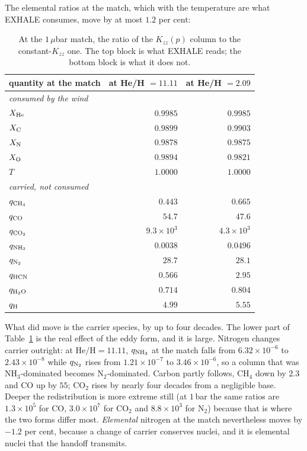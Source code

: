 \documentclass[english,a4paper]{my_memo}
\begin{document}
The elemental ratios at the match, which with the temperature are what EXHALE
consumes, move by at most $1.2$ per cent:

\begin{table}[htbp]\centering\small
\caption{At the $1\,\mu$bar match, the ratio of the $K_{zz}(p)$ column to the
constant-$K_{zz}$ one. The top block is what EXHALE reads; the bottom block
is what it does not.}
\label{tab:kzzformmatch}
\begin{tabular}{lrr}
\toprule
quantity at the match & at He/H $=11.11$ & at He/H $=2.09$ \\
\midrule
\multicolumn{3}{l}{\emph{consumed by the wind}} \\
$X_{\rm He}$ & $0.9985$ & $0.9985$ \\
$X_{\rm C}$  & $0.9899$ & $0.9903$ \\
$X_{\rm N}$  & $0.9878$ & $0.9875$ \\
$X_{\rm O}$  & $0.9894$ & $0.9821$ \\
$T$          & $1.0000$ & $1.0000$ \\
\midrule
\multicolumn{3}{l}{\emph{carried, not consumed}} \\
$q_{\rm CH_4}$ & $0.443$ & $0.665$ \\
$q_{\rm CO}$   & $54.7$  & $47.6$ \\
$q_{\rm CO_2}$ & $9.3\times10^{3}$ & $4.3\times10^{3}$ \\
$q_{\rm NH_3}$ & $0.0038$ & $0.0496$ \\
$q_{\rm N_2}$  & $28.7$  & $28.1$ \\
$q_{\rm HCN}$  & $0.566$ & $2.95$ \\
$q_{\rm H_2O}$ & $0.714$ & $0.804$ \\
$q_{\rm H}$    & $4.99$  & $5.55$ \\
\bottomrule
\end{tabular}
\end{table}

\medskip
\noindent What did move is the carrier species, by up to four decades. The
lower part of Table~\ref{tab:kzzformmatch} is the real effect of the eddy
form, and it is large. Nitrogen changes carrier outright: at
$\mathrm{He/H} = 11.11$, $q_{\rm NH_3}$ at the match falls from
$6.32\times10^{-6}$ to $2.43\times10^{-8}$ while $q_{\rm N_2}$ rises from
$1.21\times10^{-7}$ to $3.46\times10^{-6}$, so a column that was
NH$_3$-dominated becomes N$_2$-dominated. Carbon partly follows, CH$_4$ down
by $2.3$ and CO up by $55$; CO$_2$ rises by nearly four decades from a
negligible base. Deeper the redistribution is more extreme still (at $1$\,bar
the same ratios are $1.3\times10^{5}$ for CO, $3.0\times10^{7}$ for CO$_2$
and $8.8\times10^{3}$ for N$_2$) because that is where the two forms differ
most. \emph{Elemental} nitrogen at the match nevertheless moves by $-1.2$ per
cent, because a change of carrier conserves nuclei, and it is elemental
nuclei that the handoff transmits.
\end{document}
